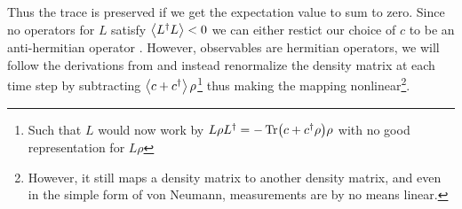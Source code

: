 Thus the trace is preserved if we get the expectation value to sum to zero. Since no operators for $L$ satisfy $\expval{L^\dagger L} < 0$ we can either restict our choice of $c$ to be an anti-hermitian operator \cite{adler_derivation_2000}. However, observables are hermitian operators, we will follow the derivations from \cite{jacobs_straightforward_2006} and instead renormalize the density matrix at each time step by subtracting $\expval{c + c^\dagger}\rho$\footnote{Such that $L$ would now work by $L\rho L^\dagger = - \Tr(c + c^\dagger\rho) \rho$ with no good representation for $L\rho$} thus making the mapping nonlinear\footnote{ However, it still maps a density matrix to another density matrix, and even in the simple form of von Neumann, measurements are by no means linear.}. 

